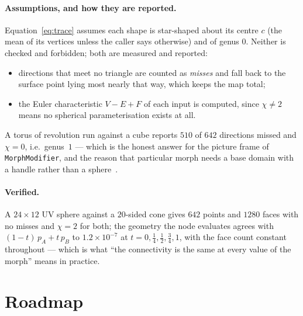 \documentclass[11pt,a4paper]{article}
\newcommand{\node}[1]{\texttt{#1}}
\begin{document}
\paragraph{Assumptions, and how they are reported.}
Equation~\eqref{eq:trace} assumes each shape is star-shaped about its centre
$c$ (the mean of its vertices unless the caller says otherwise) and of genus
$0$. Neither is checked and forbidden; both are measured and reported:

\begin{itemize}[leftmargin=1.4em]
  \item directions that meet no triangle are counted as \emph{misses} and
    fall back to the surface point lying most nearly that way, which keeps
    the map total;
  \item the Euler characteristic $V - E + F$ of each input is computed, since
    $\chi \ne 2$ means no spherical parameterisation exists at all.
\end{itemize}

A torus of revolution run against a cube reports $510$ of $642$ directions
missed and $\chi = 0$, i.e.\ genus~$1$ --- which is the honest answer for the
picture frame of \node{MorphModifier}, and the reason that particular morph
needs a base domain with a handle rather than a
sphere~\cite{praun2001,kraevoy2004,schreiner2004}.

\paragraph{Verified.} A $24\times12$ UV sphere against a $20$-sided cone
gives $642$ points and $1280$ faces with no misses and $\chi = 2$ for both;
the geometry the node evaluates agrees with $(1-t)\,p_A + t\,p_B$ to
$1.2\times10^{-7}$ at $t = 0, \tfrac14, \tfrac12, \tfrac34, 1$, with the face
count constant throughout --- which is what ``the connectivity is the same at
every value of the morph'' means in practice.

\section{Roadmap}\label{sec:roadmap}
\end{document}
